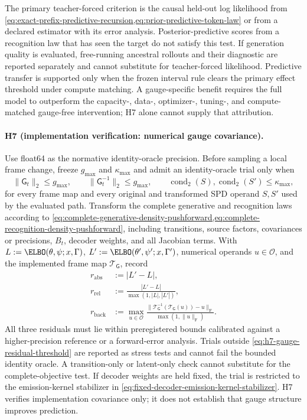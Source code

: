 The primary teacher-forced criterion is the causal held-out log likelihood from \cref{eq:exact-prefix-predictive-recursion,eq:prior-predictive-token-law} or from a declared estimator with its error analysis. Posterior-predictive scores from a recognition law that has seen the target do not satisfy this test. If generation quality is evaluated, free-running ancestral rollouts and their diagnostic are reported separately and cannot substitute for teacher-forced likelihood. Predictive transfer is supported only when the frozen interval rule clears the primary effect threshold under compute matching. A gauge-specific benefit requires the full model to outperform the capacity-, data-, optimizer-, tuning-, and compute-matched gauge-free intervention; H7 alone cannot supply that attribution.

\paragraph{H7 (implementation verification: numerical gauge covariance).}
Use float64 as the normative identity-oracle precision. Before sampling a local frame change, freeze $g_{\max}$ and $\kappa_{\max}$ and admit an identity-oracle trial only when
\begin{equation}
\|\mathsf G_t\|_2\leq g_{\max},
\qquad
\|\mathsf G_t^{-1}\|_2\leq g_{\max},
\qquad
\operatorname{cond}_2(S),\operatorname{cond}_2(S')\leq\kappa_{\max},
\label{eq:h7-gauge-residual-threshold}
\end{equation}
for every frame map and every original and transformed SPD operand $S,S'$ used by the evaluated path. Transform the complete generative and recognition laws according to \cref{eq:complete-generative-density-pushforward,eq:complete-recognition-density-pushforward}, including transitions, source factors, covariances or precisions, $B_t$, decoder weights, and all Jacobian terms. With $L:=\ELBO(\theta,\psi;x,\Gamma)$, $L':=\ELBO(\theta',\psi';x,\Gamma')$, numerical operands $u\in\mathcal O$, and the implemented frame map $\mathcal T_{\mathsf G}$, record
\begin{equation}
\begin{aligned}
r_{\mathrm{abs}}&:=|L'-L|,\\
r_{\mathrm{rel}}&:=\frac{|L'-L|}{\max(1,|L|,|L'|)},\\
r_{\mathrm{back}}&:=\max_{u\in\mathcal O}
\frac{\|\mathcal T_{\mathsf G}^{-1}(\mathcal T_{\mathsf G}(u))-u\|_{\mathrm F}}
{\max(1,\|u\|_{\mathrm F})}.
\end{aligned}
\label{eq:h7-absolute-relative-backward-residuals}
\end{equation}
All three residuals must lie within preregistered bounds calibrated against a higher-precision reference or a forward-error analysis. Trials outside \cref{eq:h7-gauge-residual-threshold} are reported as stress tests and cannot fail the bounded identity oracle. A transition-only or latent-only check cannot substitute for the complete-objective test. If decoder weights are held fixed, the trial is restricted to the emission-kernel stabilizer in \cref{eq:fixed-decoder-emission-kernel-stabilizer}. H7 verifies implementation covariance only; it does not establish that gauge structure improves prediction.

